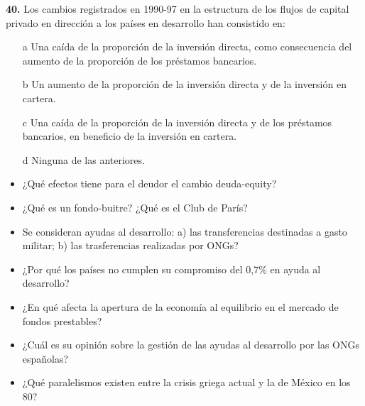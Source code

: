 \documentclass{nuevotema}
\begin{document}
\textbf{40.} Los cambios registrados en 1990-97 en la estructura de los flujos de capital privado en dirección a los países en desarrollo han consistido en:
\begin{itemize}
	\item[a] Una caída de la proporción de la inversión directa, como consecuencia del aumento de la proporción de los préstamos bancarios.
	\item[b] Un aumento de la proporción de la inversión directa y de la inversión en cartera.
	\item[c] Una caída de la proporción de la inversión directa y de los préstamos bancarios, en beneficio de la inversión en cartera.
	\item[d] Ninguna de las anteriores.
\end{itemize}

\begin{itemize}
    \item ¿Qué efectos tiene para el deudor el cambio deuda-equity?
    \item ¿Qué es un fondo-buitre? ¿Qué es el Club de París?
    \item Se consideran ayudas al desarrollo: a) las transferencias destinadas a gasto militar; b) las trasferencias realizadas por ONGs?
    \item ¿Por qué los países no cumplen su compromiso del 0,7\% en ayuda al desarrollo?
    \item ¿En qué afecta la apertura de la economía al equilibrio en el mercado de fondos prestables?
    \item ¿Cuál es su opinión sobre la gestión de las ayudas al desarrollo por las ONGs españolas?
    \item ¿Qué paralelismos existen entre la crisis griega actual y la de México en los 80?
\end{itemize}
\end{document}

